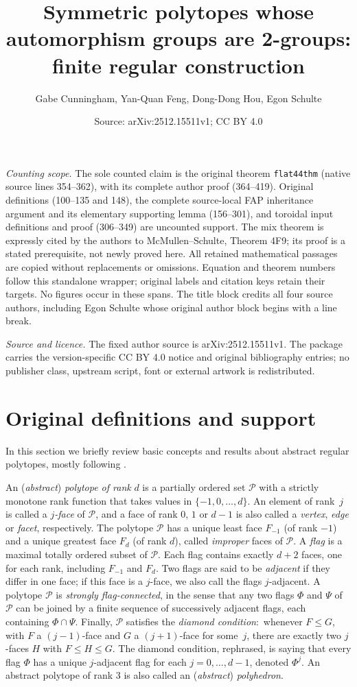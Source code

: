 \documentclass[10pt,a4paper]{amsart}
\title{Symmetric polytopes whose automorphism groups are 2-groups: finite regular construction}
\author{Gabe Cunningham, Yan-Quan Feng, Dong-Dong Hou, Egon Schulte}
\date{Source: arXiv:2512.15511v1; CC BY 4.0}
\theoremstyle{definition}
\begin{document}
\maketitle
\noindent\textit{Counting scope.} The sole counted claim is the original theorem \texttt{flat44thm} (native source lines 354--362), with its complete author proof (364--419). Original definitions (100--135 and 148), the complete source-local FAP inheritance argument and its elementary supporting lemma (156--301), and toroidal input definitions and proof (306--349) are uncounted support. The mix theorem is expressly cited by the authors to McMullen--Schulte, Theorem 4F9; its proof is a stated prerequisite, not newly proved here. All retained mathematical passages are copied without replacements or omissions. Equation and theorem numbers follow this standalone wrapper; original labels and citation keys retain their targets. No figures occur in these spans. The title block credits all four source authors, including Egon Schulte whose original author block begins with a line break.\par\medskip
\noindent\textit{Source and licence.} The fixed author source is arXiv:2512.15511v1. The package carries the version-specific CC BY 4.0 notice and original bibliography entries; no publisher class, upstream script, font or external artwork is redistributed.\par\medskip
\section{Original definitions and support}
In this section we briefly review basic concepts and results about abstract regular polytopes, mostly following \cite[Chs. 2,\,3]{McMSch2002}. 

An (\emph{abstract\/}) \textit{polytope of rank\/} $d$ is a partially ordered set $\mathcal{P}$ with a strictly monotone rank function that takes values in $\{-1,0, \ldots, d\}$. An element of rank~$j$ is called a \textit{$j$-face\/} of $\mathcal{P}$, and a face of rank $0$, $1$ or $d-1$ is also called a \textit{vertex\/}, \textit{edge\/} or \textit{facet\/}, respectively. The polytope $\mathcal{P}$ has a unique least face $F_{-1}$ (of rank $-1$) and a unique greatest face $F_d$ (of rank $d$), called \textit{improper\/} faces of $\mathcal{P}$. A \textit{flag\/} is a maximal totally ordered subset of $\mathcal{P}$. Each flag contains exactly $d+2$ faces, one for each rank, including $F_{-1}$ and $F_{d}$. Two flags are said to be \textit{adjacent} if they differ in one face; if this face is a $j$-face, we also call the flags $j$-adjacent. A polytope $\mathcal{P}$ is \textit{strongly flag-connected}, in the sense that any two flags $\Phi$ and $\Psi$ of $\mathcal{P}$ can be joined by a finite sequence of successively adjacent flags, each containing $\Phi \cap \Psi$. Finally, $\mathcal{P}$ satisfies the \textit{diamond condition\/}:\ whenever $F \leq G$, with $F$ a $(j-1)$-face and $G$ a $(j+1)$-face for some~$j$, there are exactly two $j$-faces $H$ with $F \leq H \leq G$. The diamond condition, rephrased, is saying that every flag $\Phi$ has a unique $j$-adjacent flag for each $j=0, \dots, d-1$, denoted $\Phi^j$.  An abstract polytope of rank 3 is also called an (\emph{abstract}) \emph{polyhedron}.
\end{document}
